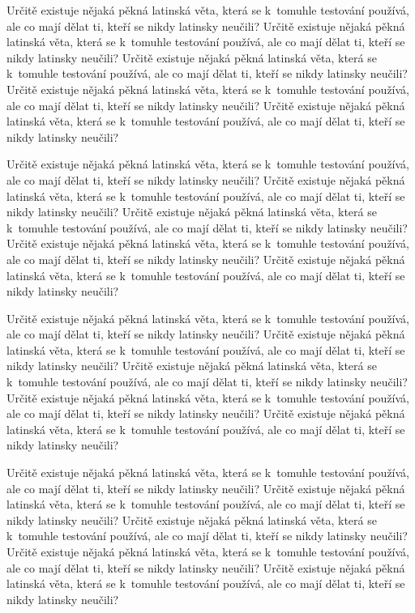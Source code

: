 \documentclass[11pt,twoside,a4paper]{book}
\begin{document}
Určitě existuje nějaká pěkná latinská věta, která se k~tomuhle testování používá, ale co mají dělat ti, kteří se nikdy
latinsky neučili? Určitě existuje nějaká pěkná latinská věta, která se k~tomuhle testování používá, ale co mají dělat
ti, kteří se nikdy latinsky neučili? Určitě existuje nějaká pěkná latinská věta, která se k~tomuhle testování používá,
ale co mají dělat ti, kteří se nikdy latinsky neučili? Určitě existuje nějaká pěkná latinská věta, která se k~tomuhle
testování používá, ale co mají dělat ti, kteří se nikdy latinsky neučili? Určitě existuje nějaká pěkná latinská věta,
která se k~tomuhle testování používá, ale co mají dělat ti, kteří se nikdy latinsky neučili?

Určitě existuje nějaká pěkná latinská věta, která se k~tomuhle testování používá, ale co mají dělat ti, kteří se nikdy
latinsky neučili? Určitě existuje nějaká pěkná latinská věta, která se k~tomuhle testování používá, ale co mají dělat
ti, kteří se nikdy latinsky neučili? Určitě existuje nějaká pěkná latinská věta, která se k~tomuhle testování používá,
ale co mají dělat ti, kteří se nikdy latinsky neučili? Určitě existuje nějaká pěkná latinská věta, která se k~tomuhle
testování používá, ale co mají dělat ti, kteří se nikdy latinsky neučili? Určitě existuje nějaká pěkná latinská věta,
která se k~tomuhle testování používá, ale co mají dělat ti, kteří se nikdy latinsky neučili?

Určitě existuje nějaká pěkná latinská věta, která se k~tomuhle testování používá, ale co mají dělat ti, kteří se nikdy
latinsky neučili? Určitě existuje nějaká pěkná latinská věta, která se k~tomuhle testování používá, ale co mají dělat
ti, kteří se nikdy latinsky neučili? Určitě existuje nějaká pěkná latinská věta, která se k~tomuhle testování používá,
ale co mají dělat ti, kteří se nikdy latinsky neučili? Určitě existuje nějaká pěkná latinská věta, která se k~tomuhle
testování používá, ale co mají dělat ti, kteří se nikdy latinsky neučili? Určitě existuje nějaká pěkná latinská věta,
která se k~tomuhle testování používá, ale co mají dělat ti, kteří se nikdy latinsky neučili?

Určitě existuje nějaká pěkná latinská věta, která se k~tomuhle testování používá, ale co mají dělat ti, kteří se nikdy
latinsky neučili? Určitě existuje nějaká pěkná latinská věta, která se k~tomuhle testování používá, ale co mají dělat
ti, kteří se nikdy latinsky neučili? Určitě existuje nějaká pěkná latinská věta, která se k~tomuhle testování používá,
ale co mají dělat ti, kteří se nikdy latinsky neučili? Určitě existuje nějaká pěkná latinská věta, která se k~tomuhle
testování používá, ale co mají dělat ti, kteří se nikdy latinsky neučili? Určitě existuje nějaká pěkná latinská věta,
která se k~tomuhle testování používá, ale co mají dělat ti, kteří se nikdy latinsky neučili?
\end{document}
